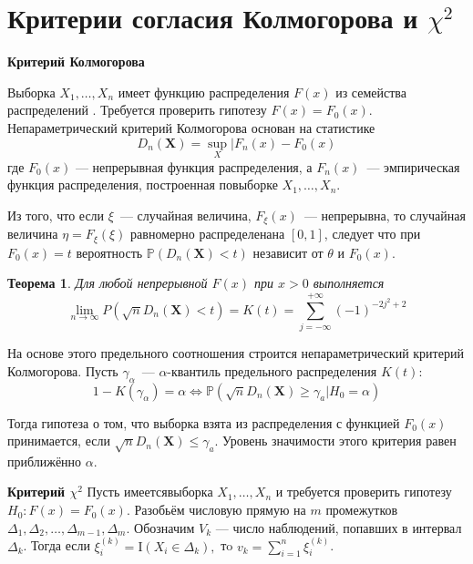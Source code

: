 \documentclass[oneside,final,14pt]{extreport}
\newtheorem{thm}{Теорема}[section]
\theoremstyle{definition}
\begin{document}
\section{Критерии согласия Колмогорова и $\chi^{2}$}

{\bf Критерий Колмогорова}

Выборка $X_1, \ldots, X_n$ имеет функцию распределения $F(x)$ из семейства распределений . Требуется проверить гипотезу $F(x)=F_{0}(x)$. Непараметрический критерий Колмогорова основан на статистике
\begin{equation*}
    D_{n}(\mathbf{X})=\sup _{X} | F_{n}(x)-F_{0}(x)
\end{equation*}
где $F_{0}(x)$  —  непрерывная функция распределения, а $F_{n}(x)$~---  эмпирическая функция распределения, построенная повыборке $X_1, \ldots, X_n$.

Из того, что если $\xi$~--- случайная величина, $F_{\xi}(x)$~--- непрерывна, то случайная величина $\eta=F_{\xi}(\xi)$ равномерно распределенана $[0,1]$, следует что при $F_{0}(x)=t$ вероятность $\mathbb{P}\left(D_{n}(\mathbf{X})<t\right)$ независит от $\theta$ и $F_{0}(x)$.

\begin{thm}
    Для любой непрерывной $F(x)$ при $x > 0$ выполняется
    \begin{equation*}
        \lim _{n \to \infty} P\left(\sqrt{n} D_{n}(\mathbf{X})<t\right)=K(t)=\sum_{j=-\infty}^{+\infty}(-1)^{-2 j^{2}+2}
    \end{equation*}
\end{thm}

На основе этого предельного соотношения строится непараметрический критерий Колмогорова. Пусть $\gamma_{\alpha}$~--- $\alpha$-квантиль предельного распределения $K(t)$:
\begin{equation*}
    1-K\left(\gamma_{\alpha}\right)=\alpha \Leftrightarrow \mathbb{P}\left(\sqrt{n} D_{n}(\mathbf{X}) \geq \gamma_{a} | H_{0}=\alpha\right)
\end{equation*}

Тогда гипотеза о том, что выборка взята из распределения с функцией $F_{0}(x)$ принимается, если $\sqrt{n} D_{n}(\mathbf{X}) \leqslant \gamma_{a}$. Уровень значимости этого критерия равен приближённо $\alpha$.

{\bf Критерий $\chi^{2}$}
Пусть имеетсявыборка $X_1, \ldots, X_n$ и требуется проверить гипотезу $H_{0}: F(x)=F_{0}(x)$. Разобьём числовую прямую на $m$ промежутков $\Delta_{1}, \Delta_{2}, \ldots, \Delta_{m-1}, \Delta_{m}$. Обозначим $V_{k}$ — число наблюдений, попавших в интервал $\Delta_{k}$. Тогда если $\xi_{i}^{(k)}=\mathrm{I}\left(X_{i} \in \Delta_{k}\right),$ тo $v_{k}=\sum_{i=1}^{n} \xi_{i}^{(k)}$.
\end{document}
